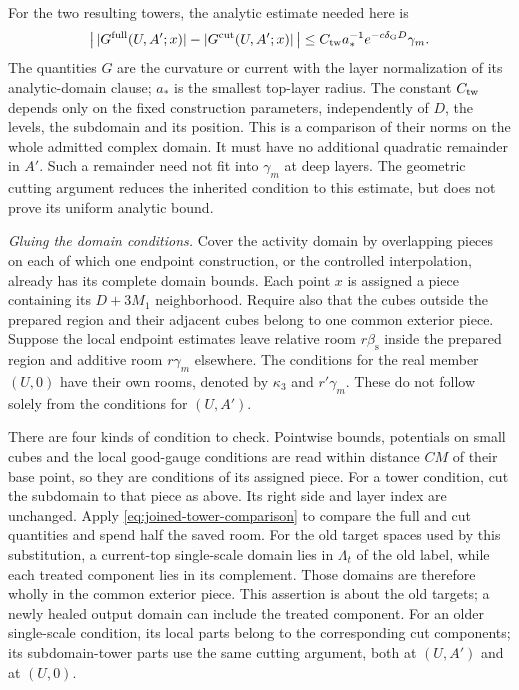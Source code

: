 \documentclass[11pt,letterpaper,reqno]{amsart}
\theoremstyle{definition}
\theoremstyle{remark}
\begin{document}
For the two resulting towers, the analytic estimate needed here is
\begin{equation}\label{eq:joined-tower-comparison}
 \left|\,|G^{\rm full}(U,A';x)|
                 -|G^{\rm cut}(U,A';x)|\,\right|
 \le C_{\rm tw}a_*^{-1}e^{-c\delta_{\mathrm G}D}\gamma_m.
\end{equation}
The quantities $G$ are the curvature or current with the layer
normalization of its analytic-domain clause; $a_*$ is the smallest
top-layer radius. The constant $C_{\rm tw}$ depends only on the
fixed construction parameters, independently of $D$, the levels,
the subdomain and its position. This is a comparison of their norms on the
whole admitted complex domain. It must have no additional
quadratic remainder in $A'$. Such a remainder need not fit into
$\gamma_m$ at deep layers. The geometric cutting argument reduces
the inherited condition to this estimate, but does not prove its
uniform analytic bound.

\emph{Gluing the domain conditions.}
Cover the activity domain by overlapping pieces on each of which
one endpoint construction, or the controlled interpolation,
already has its complete domain bounds. Each point $x$ is assigned
a piece containing its $D+3M_1$ neighborhood. Require also that
the cubes outside the prepared region and their adjacent cubes
belong to one common exterior piece. Suppose the local endpoint
estimates leave relative room $r\beta_{\mathrm s}$ inside the
prepared region and additive room $r\gamma_m$ elsewhere.
The conditions for the real member $(U,0)$ have their own rooms,
denoted by $\kappa_3$ and $r'\gamma_m$. These do not follow
solely from the conditions for $(U,A')$.

There are four kinds of condition to check. Pointwise bounds,
potentials on small cubes and the local good-gauge conditions are
read within distance $CM$ of their base point, so they are
conditions of its assigned piece. For a tower condition, cut the
subdomain to that piece as above. Its right side and layer index
are unchanged. Apply \eqref{eq:joined-tower-comparison} to compare
the full and cut quantities and spend half the saved room.
For the old target spaces used by this substitution, a current-top
single-scale domain lies in $\Lambda_t$ of the old label, while
each treated component lies in its complement. Those domains are
therefore wholly in the common exterior piece. This assertion is
about the old targets; a newly healed output domain can include the
treated component. For an older single-scale condition,
its local parts belong to the corresponding cut components;
its subdomain-tower parts use the same cutting argument, both at
$(U,A')$ and at $(U,0)$.
\end{document}
